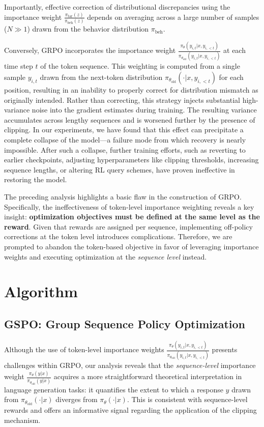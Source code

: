 Importantly, effective correction of distributional discrepancies using the importance weight $\frac{ \pi_\text{tar} (z) }{ \pi_\text{beh} (z)}$ depends on averaging across a large number of samples ($N \gg 1$) drawn from the behavior distribution $\pi_\text{beh}$.

Conversely, GRPO incorporates the importance weight $\frac{ \pi_{\theta} (y_{i,t} | x, y_{i,<t}) }{ \pi_{\theta_\text{old}} (y_{i,t} | x,y_{i,<t})}$ at each time step $t$ of the token sequence. This weighting is computed from a single sample $y_{i,t}$ drawn from the next-token distribution $\pi_{\theta_\text{old}}( \cdot | x, y_{i,<t})$ for each position, resulting in an inability to properly correct for distribution mismatch as originally intended. Rather than correcting, this strategy injects substantial high-variance noise into the gradient estimates during training. The resulting variance accumulates across lengthy sequences and is worsened further by the presence of clipping. In our experiments, we have found that this effect can precipitate a complete collapse of the model—a failure mode from which recovery is nearly impossible. After such a collapse, further training efforts, such as reverting to earlier checkpoints, adjusting hyperparameters like clipping thresholds, increasing sequence lengths, or altering RL query schemes, have proven ineffective in restoring the model.

The preceding analysis highlights a basic flaw in the construction of GRPO. Specifically, the ineffectiveness of token-level importance weighting reveals a key insight: \textbf{optimization objectives must be defined at the same level as the reward}. Given that rewards are assigned per sequence, implementing off-policy corrections at the token level introduces complications. Therefore, we are prompted to abandon the token-based objective in favor of leveraging importance weights and executing optimization at the \textit{sequence level} instead.

\section{Algorithm}

\subsection{GSPO: Group Sequence Policy Optimization}

Although the use of token-level importance weights $\frac{ \pi_{\theta} (y_{i,t} | x, y_{i,<t}) }{ \pi_{\theta_\text{old}} (y_{i,t} | x,y_{i,<t})}$ presents challenges within GRPO, our analysis reveals that the \textit{sequence-level} importance weight $\frac{ \pi_{\theta} (y | x) }{ \pi_{\theta_\text{old}} (y | x)}$ acquires a more straightforward theoretical interpretation in language generation tasks: it quantifies the extent to which a response $y$ drawn from $\pi_{\theta_\text{old}} (\cdot | x)$ diverges from $\pi_{\theta} (\cdot | x)$. This is consistent with sequence-level rewards and offers an informative signal regarding the application of the clipping mechanism.

